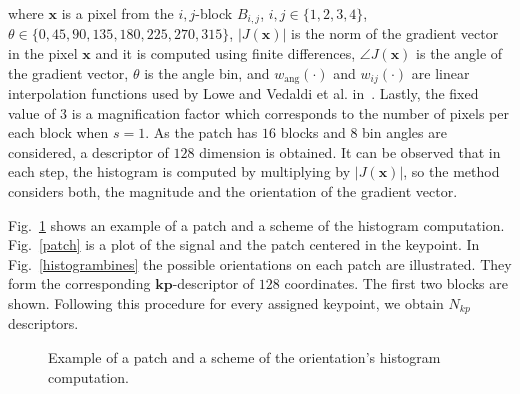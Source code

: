 \documentclass[entropy,article,submit,moreauthors,pdftex,10pt,a4paper]{mdpi}
\begin{document}
\noindent  where $\mathbf{x}$ is a pixel from  the $i,j$-block $B_{i,j}$, $ i,j \in \{1,2,3,4\} $, $ \theta \in \{0, 45, 90, 135, 180, 225, 270, 315\} $,  $ |J(\mathbf{x})| $ is the norm of the gradient vector in the pixel $\mathbf{x}$ and it is computed using finite differences, $\angle J(\mathbf{x}) $ is the angle of the gradient vector,  $\theta$ is the angle bin,   and $ w_\mathrm{ang}(\cdot) $  and $ w_{ij}(\cdot) $ are linear interpolation functions used by Lowe and Vedaldi et al. in~\citep{Lowe2004,Vedaldi2010}.  Lastly, the fixed value of $ 3 $ is a magnification factor which corresponds to the number of pixels per each block when $s = 1$.  As the patch has  $16$ blocks and  $8$ bin angles are considered, a descriptor of $128$ dimension is obtained. It can be observed that in each step, the histogram is computed by multiplying by $ |J(\mathbf{x})| $, so the method considers both, the magnitude and the orientation of the gradient vector. 


Fig.~\ref{fig:sampledescriptor} shows an example of a patch and a scheme of the histogram computation. Fig.~\ref{patch} is a plot of the signal and the patch centered in the keypoint. In Fig.~\ref{histogrambines} the possible orientations on each patch are illustrated. They form the corresponding $\mathbf{kp}$-descriptor of $128$ coordinates. The first two blocks are shown.  Following this procedure for every assigned keypoint, we obtain $N_{kp}$ descriptors.
 

 
\begin{figure}[H]
\centering
{}
\caption{ Example of a patch and a scheme of the orientation's histogram computation.}
\label{fig:sampledescriptor}
\end{figure}
\end{document}
